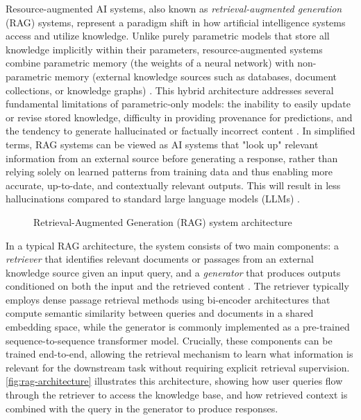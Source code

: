 Resource-augmented AI systems, also known as \emph{retrieval-augmented generation} (RAG) systems, represent a paradigm shift in how artificial intelligence systems access and utilize knowledge. Unlike purely parametric models that store all knowledge implicitly within their parameters, resource-augmented systems combine parametric memory (the weights of a neural network) with non-parametric memory (external knowledge sources such as databases, document collections, or knowledge graphs) \parencite{lewis_retrieval-augmented_2021}. This hybrid architecture addresses several fundamental limitations of parametric-only models: the inability to easily update or revise stored knowledge, difficulty in providing provenance for predictions, and the tendency to generate hallucinated or factually incorrect content \parencite{lewis_retrieval-augmented_2021}. In simplified terms, RAG systems can be viewed as AI systems that "look up" relevant information from an external source before generating a response, rather than relying solely on learned patterns from training data and thus enabling more accurate, up-to-date, and contextually relevant outputs. This will result in less hallucinations compared to standard large language models (LLMs) \parencite{lewis_retrieval-augmented_2021}.

\begin{figure}[htbp]
    \centering
    \small{\resizebox{\textwidth}{!}{}}
    \caption{Retrieval-Augmented Generation (RAG) system architecture}
    \label{fig:rag-architecture}
\end{figure}

In a typical RAG architecture, the system consists of two main components: a \emph{retriever} that identifies relevant documents or passages from an external knowledge source given an input query, and a \emph{generator} that produces outputs conditioned on both the input and the retrieved content \parencite{lewis_retrieval-augmented_2021}. The retriever typically employs dense passage retrieval methods using bi-encoder architectures that compute semantic similarity between queries and documents in a shared embedding space, while the generator is commonly implemented as a pre-trained sequence-to-sequence transformer model. Crucially, these components can be trained end-to-end, allowing the retrieval mechanism to learn what information is relevant for the downstream task without requiring explicit retrieval supervision. \autoref{fig:rag-architecture} illustrates this architecture, showing how user queries flow through the retriever to access the knowledge base, and how retrieved context is combined with the query in the generator to produce responses.

